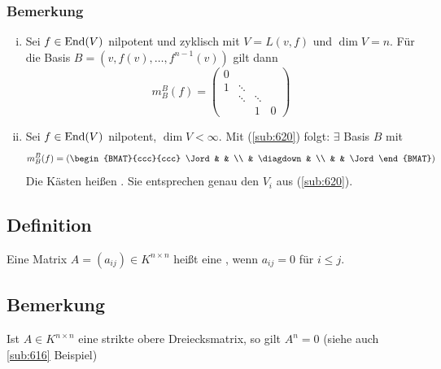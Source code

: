 \subsubsection[Bemerkung Jordankästen]{Bemerkung} %
\label{sub:6215}
\begin{enumerate}[i)]
	\item Sei $f \in \operatorname{End}(V)$ nilpotent und zyklisch mit $V=L(v,f)$ und $\dim V=n$. Für die Basis $B=(v, f(v), \ldots , f^{n-1}(v))$ gilt dann
	\[
		m_B^B(f) = \begin{pmatrix}
			0 & & & \\
			1 &\ddots & &  \\
			& \ddots & \ddots & \\
			 & & 1 & 0
		\end{pmatrix}
	\]
	\item \label{6215:enum:2} Sei $f \in \operatorname{End}(V)$ nilpotent, $\dim V < \infty$. Mit (\ref{sub:620}) folgt: $\exists$ Basis $B$ mit 
	\[
		m_B^B(f) = \left( \begin{BMAT}{ccc}{ccc}
			\Jord  &  &  \\
			 & \diagdown &  \\
			 &  & \Jord
		\end{BMAT} \right) 
	\] 
	Die Kästen heißen . Sie entsprechen genau den $V_i$ aus (\ref{sub:620}). 
\end{enumerate}

\subsection[Definition: strikte obere Dreiecksmatrix]{Definition} %
\label{sub:622}
Eine Matrix $A=(a_{ij}) \in K^{n \times n}$ heißt eine , wenn $a_{ij} = 0$ für $i \le j$. 
\marginnote{\enquote{$\le$} !!!}

\subsection[Bemerkung über die Potenz einer strikten oberen Dreiecksmatrix]{Bemerkung} %
\label{sub:623}
Ist $A \in K^{n \times n}$ eine strikte obere Dreiecksmatrix, so gilt $A^n=0$ \hfill {\footnotesize (siehe auch \ref{sub:616} Beispiel)}

